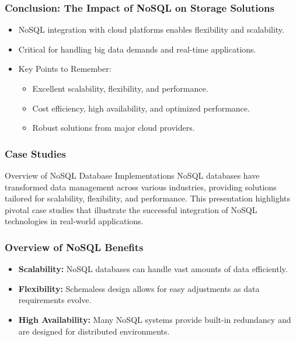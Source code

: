 \documentclass[aspectratio=169]{beamer}
\begin{document}
\begin{frame}[fragile]
    \frametitle{Conclusion: The Impact of NoSQL on Storage Solutions}
    \begin{itemize}
        \item NoSQL integration with cloud platforms enables flexibility and scalability.
        \item Critical for handling big data demands and real-time applications.
        \item Key Points to Remember:
            \begin{itemize}
                \item Excellent scalability, flexibility, and performance.
                \item Cost efficiency, high availability, and optimized performance.
                \item Robust solutions from major cloud providers.
            \end{itemize}
    \end{itemize}
\end{frame}

\begin{frame}[fragile]
    \frametitle{Case Studies}
    \begin{block}{Overview of NoSQL Database Implementations}
        NoSQL databases have transformed data management across various industries, providing solutions tailored for scalability, flexibility, and performance. 
        This presentation highlights pivotal case studies that illustrate the successful integration of NoSQL technologies in real-world applications.
    \end{block}
\end{frame}

\begin{frame}[fragile]
    \frametitle{Overview of NoSQL Benefits}
    \begin{itemize}
        \item \textbf{Scalability:} NoSQL databases can handle vast amounts of data efficiently.
        \item \textbf{Flexibility:} Schemaless design allows for easy adjustments as data requirements evolve.
        \item \textbf{High Availability:} Many NoSQL systems provide built-in redundancy and are designed for distributed environments.
    \end{itemize}
\end{frame}
\end{document}
